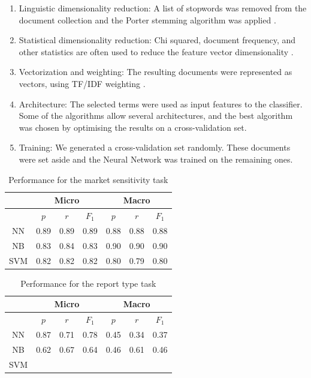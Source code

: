 \documentclass[a4paper,twocolumn]{article}
\begin{document}
\begin{enumerate}

\item Linguistic dimensionality reduction: A list of stopwords \cite{salton:89} was removed from the document collection and the Porter stemming algorithm was applied \cite{manning:99}.
\item Statistical dimensionality reduction: Chi squared, document frequency, and other statistics are often used to reduce the feature vector dimensionality \cite{manning:99} \cite{sebastiani:02}.
\item Vectorization and weighting: The resulting documents were represented as vectors, using TF/IDF weighting \cite{salton:88} \cite{yang:97}. 
\item Architecture: The selected terms were used as input features to the classifier. Some of the algorithms allow several architectures, and the best algorithm was chosen by optimising the results on a cross-validation set. 
\item Training: We generated a cross-validation set randomly. These documents were set aside and the Neural Network was trained on the remaining ones. 


\end{enumerate}

\begin{table}
\begin{tabular}{|c|c|c|c|c|c|c|}
\hline
   & \multicolumn{3}{|c|}{Micro} & \multicolumn{3}{|c|}{Macro} \\
\hline
   & $p$  & $r$  &$F_1$ & $p$  & $r$  & $F_1$ \\
\hline
 NN & 0.89 & 0.89 & 0.89 & 0.88 & 0.88 & 0.88 \\
 NB & 0.83 & 0.84 & 0.83 & 0.90 & 0.90 & 0.90 \\
SVM & 0.82 & 0.82 & 0.82 & 0.80 & 0.79 & 0.80 \\
\hline
\end{tabular}
\caption{Performance for the market sensitivity task}
\label{res:sens}
\end{table}


\begin{table}
\begin{tabular}{|c|c|c|c|c|c|c|}
\hline
   & \multicolumn{3}{|c|}{Micro} & \multicolumn{3}{|c|}{Macro} \\
\hline
   & $p$  & $r$  &$F_1$ & $p$  & $r$  & $F_1$ \\
\hline
NN & 0.87 & 0.71 & 0.78 & 0.45 & 0.34 & 0.37  \\
NB & 0.62 & 0.67 & 0.64 & 0.46 & 0.61 & 0.46  \\
SVM &  &  &  &  &  & \\

\hline
\end{tabular}
\caption{Performance for the report type task}
\label{res:rept}
\end{table}
\end{document}
